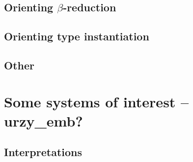 \documentclass[runningheads,a4paper]{llncs}
\begin{document}
\subsection{Orienting $\beta$-reduction}

\subsection{Orienting type instantiation}

\subsection{Other}

\section{Some systems of interest -- urzy\_emb?}

\subsection{Interpretations}
\end{document}
